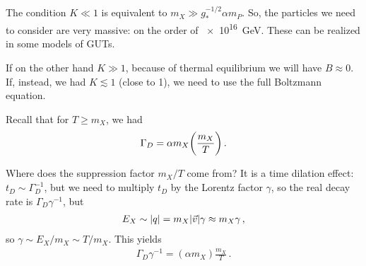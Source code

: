 \documentclass[main.tex]{subfiles}
\begin{document}
The condition \(K \ll 1\) is equivalent to \(m_X \gg g_*^{-1/2} \alpha m_P\). 
So, the particles we need to consider are very massive: on the order of \SI{e16}{GeV}. These can be realized in some models of GUTs.


If on the other hand \(K \gg 1\), because of thermal equilibrium we will have \(B \approx 0\). 
If, instead, we had \(K \lesssim 1\) (close to 1), we need to use the full Boltzmann equation. 

Recall that for \(T \geq m_X\), we had 
%
\begin{align}
\Gamma _D = \alpha  m_X \qty( \frac{m_X}{T})
\,.
\end{align}

Where does the suppression factor \(m_X / T \) come from? 
It is a time dilation effect: \(t_D \sim \Gamma_D^{-1}\), but we need to multiply \(t_D\) by the Lorentz factor \(\gamma \), so the real decay rate is \(\Gamma _D \gamma^{-1} \), but 
%
\begin{align}
E_X \sim \abs{q} = m_X \abs{\vec{v}} \gamma \approx m_X \gamma 
\,,
\end{align}
%
so \(\gamma \sim E_X / m_X \sim T / m_X\). This yields 
%
\begin{align}
\Gamma _D \gamma^{-1} = (\alpha  m_X) \frac{m_X}{T}
\,.
\end{align}
\end{document}
